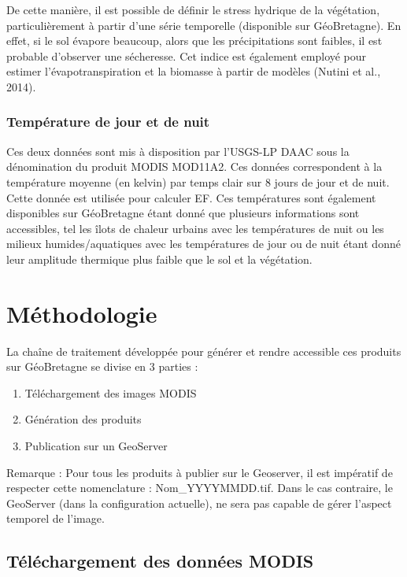 \documentclass[10pt,a4paper]{article}
\begin{document}
De cette manière, il est possible de définir le stress hydrique de la végétation, particulièrement à partir d'une série temporelle (disponible sur GéoBretagne). En effet, si le sol évapore beaucoup, alors que les précipitations sont faibles, il est probable d'observer une sécheresse. Cet indice est également employé pour estimer l'évapotranspiration et la biomasse à partir de modèles (Nutini et al., 2014).

\subsubsection{Température de jour et de nuit}

Ces deux données sont mis à disposition par l'USGS-LP DAAC sous la dénomination du produit MODIS MOD11A2. Ces données correspondent à la température moyenne (en kelvin) par temps clair sur 8 jours de jour et de nuit. Cette donnée est utilisée pour calculer EF. Ces températures sont également disponibles sur GéoBretagne étant donné que plusieurs informations sont accessibles, tel les îlots de chaleur urbains avec les températures de nuit ou les milieux humides/aquatiques avec les températures de jour ou de nuit étant donné leur amplitude thermique plus faible que le sol et la végétation.

\section{Méthodologie}

La chaîne de traitement développée pour générer et rendre accessible ces produits sur GéoBretagne se divise en 3 parties :

\begin{enumerate}
\item Téléchargement des images MODIS
\item Génération des produits
\item Publication sur un GeoServer
\end{enumerate}

Remarque : Pour tous les produits à publier sur le Geoserver, il est impératif de respecter cette nomenclature : Nom\_YYYYMMDD.tif. Dans le cas contraire, le GeoServer (dans la configuration actuelle), ne sera pas capable de gérer l'aspect temporel de l'image.

\subsection{Téléchargement des données MODIS}
\end{document}
